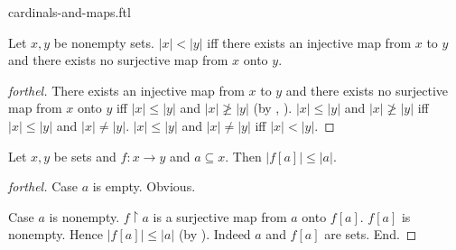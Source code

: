 \documentclass{naproche-library}
\begin{document}
\begin{smodule}[title=Cardinal Numbers and Maps]{cardinals-and-maps.ftl}
\begin{proposition}[forthel,id=SET_THEORY_06_5843717288099840]
  Let $x, y$ be nonempty sets.
  $|x| < |y|$ iff there exists an injective map from $x$ to $y$ and there exists no surjective map from $x$ onto $y$.
\end{proposition}
\begin{proof}[forthel]
  There exists an injective map from $x$ to $y$ and there exists no surjective map from $x$ onto $y$ iff $|x| \leq |y|$ and $|x| \ngeq |y|$ (by , ).
  $|x| \leq |y|$ and $|x| \ngeq |y|$ iff $|x| \leq |y|$ and $|x| \neq |y|$.
  $|x| \leq |y|$ and $|x| \neq |y|$ iff $|x| < |y|$.
\end{proof}

\begin{proposition}[forthel,id=SET_THEORY_06_8113916590686208]
  Let $x, y$ be sets and $f : x \to y$ and $a \subseteq x$.
  Then $|f[a]| \leq |a|$.
\end{proposition}
\begin{proof}[forthel]
  Case $a$ is empty. Obvious.

  Case $a$ is nonempty.
    $f \restriction a$ is a surjective map from $a$ onto $f[a]$.
    $f[a]$ is nonempty.
    Hence $|f[a]| \leq |a|$ (by ).
    Indeed $a$ and $f[a]$ are sets.
  End.
\end{proof}
\end{smodule}
\end{document}
